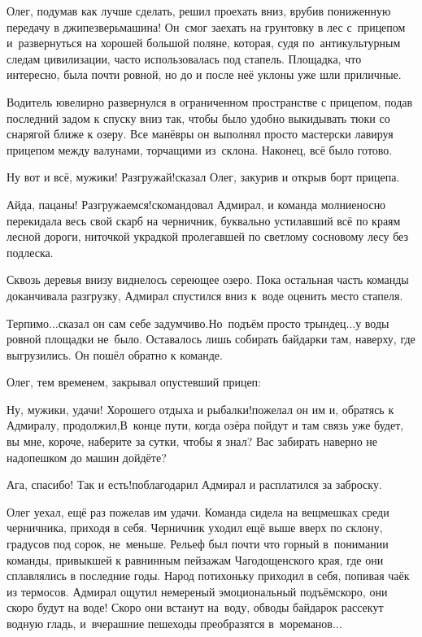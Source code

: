Олег, подумав как лучше сделать, решил проехать вниз, врубив пониженную передачу в джипе\mdash зверь\nobreakdash\sdash\nobreakdash машина! Он~смог заехать на грунтовку в лес с~прицепом и~развернуться на хорошей большой поляне, которая, судя по~антикультурным следам цивилизации, часто использовалась под стапель. Площадка, что интересно, была почти ровной, но до и после неё уклоны уже шли приличные.

Водитель ювелирно развернулся в ограниченном пространстве с прицепом, подав последний задом к спуску вниз так, чтобы было удобно выкидывать тюки со снарягой ближе к озеру. Все манёвры он выполнял просто мастерски лавируя прицепом между валунами, торчащими из~склона. Наконец, всё было готово.

\diagdash Ну вот и всё, мужики! Разгружай!\mdash сказал Олег, закурив и открыв борт прицепа.

\diagdash Айда, пацаны! Разгружаемся!\mdash скомандовал Адмирал, и команда молниеносно перекидала весь свой скарб на черничник, буквально устилавший всё по краям лесной дороги, ниточкой украдкой пролегавшей по светлому сосновому лесу без подлеска. 

Сквозь деревья внизу виднелось сереющее озеро. Пока остальная часть команды доканчивала разгрузку, Адмирал спустился вниз к~воде оценить место стапеля. 

\diagdash Терпимо$\ldots$\mdash сказал он сам себе задумчиво.\mdash Но~подъём просто трындец$\ldots$\mdash у воды ровной площадки не~было. Оставалось лишь собирать байдарки там, наверху, где выгрузились. Он пошёл обратно к команде.

Олег, тем временем, закрывал опустевший прицеп:

\diagdash Ну, мужики, удачи! Хорошего отдыха и рыбалки!\mdash пожелал он им и, обратясь к Адмиралу, продолжил,\mdash В~конце пути, когда озёра пойдут и там связь уже будет, вы мне, короче, наберите за сутки, чтобы я знал? Вас забирать наверно не надо\mdash пешком до машин дойдёте?

\diagdash Ага, спасибо! Так и есть!\mdash поблагодарил Адмирал и расплатился за заброску.

Олег уехал, ещё раз пожелав им удачи. Команда сидела на вещмешках среди черничника, приходя в себя. Черничник уходил ещё выше вверх по склону, градусов под сорок, не~меньше. Рельеф был почти что горный в~понимании команды, привыкшей к равнинным пейзажам Чагодощенского края, где они сплавлялись в последние годы. Народ потихоньку приходил в себя, попивая чаёк из термосов. Адмирал ощутил немереный эмоциональный подъём\mdash скоро, они скоро будут на воде! Скоро они встанут на~воду, обводы байдарок рассекут водную гладь, и~вчерашние пешеходы преобразятся в~мореманов$\ldots$ 

